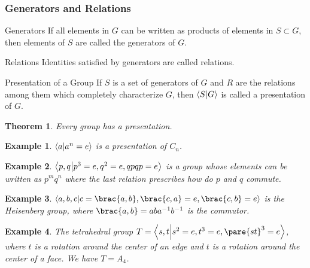 \documentclass[hidelinks]{article}
\newtheorem{theorem}{Theorem}
\newtheorem{example}{Example}
\begin{document}

\subsubsection{Generators and Relations} %
\label{ssub:generators}

\begin{termdef}{Generators}
    If all elements in $G$ can be written as products of elements in $S\subset G$, then elements of $S$ are called the generators of $G$.
\end{termdef}
\begin{termdef}{Relations}
    Identities satisfied by generators are called relations.
\end{termdef}
\begin{termdef}{Presentation of a Group}
    If $S$ is a set of generators of $G$ and $R$ are the relations among them which completely characterize $G$, then $\bra{S}\ket{G}$ is called a presentation of $G$.
\end{termdef}
\begin{theorem}
    Every group has a presentation.
\end{theorem}
\begin{sample}
    \begin{example}
        $\bra{a}\ket{a^n = e}$ is a presentation of $C_n$.
    \end{example}
\end{sample}
\begin{sample}
    \begin{example}
        $\bra{p,q}\ket{p^3 = e,q^2 = e, qpqp=e}$ is a group whose elements can be written as $p^m q^n$ where the last relation prescribes how do $p$ and $q$ commute.
    \end{example}
\end{sample}
\begin{sample}
    \begin{example}
        $\bra{a,b,c}\ket{c=\brac{a,b},\brac{c,a} = e,\brac{c,b} = e}$ is the Heisenberg group, where $\brac{a,b} = aba^{-1}b^{-1}$ is the commutor.
    \end{example}
\end{sample}
\begin{sample}
    \begin{example}
        The tetrahedral group $T = \bra{s,t}\ket{s^2 = e, t^3 = e,\pare{st}^3=e}$, where $t$ is a rotation around the center of an edge and $t$ is a rotation around the center of a face. We have $T=A_4$.
    \end{example}
\end{sample}
\end{document}
